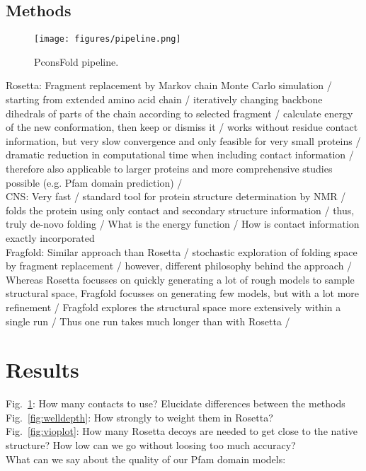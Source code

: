 \documentclass{bioinfo}
\begin{document}
\begin{methods}
\section{Methods}
\begin{figure}[!tpb]%
    \centerline{\texttt{[image: figures/pipeline.png]}}
\caption{PconsFold pipeline.}\label{fig:main}
\end{figure}
Rosetta: Fragment replacement by Markov chain Monte Carlo simulation / starting from extended amino acid chain / iteratively changing backbone dihedrals of parts of the chain according to selected fragment / calculate energy of the new conformation, then keep or dismiss it / works without residue contact information, but very slow convergence and only feasible for very small proteins / dramatic reduction in computational time when including contact information / therefore also applicable to larger proteins and more comprehensive studies possible (e.g. Pfam domain prediction) / \\
CNS: Very fast / standard tool for protein structure determination by NMR / folds the protein using only contact and secondary structure information / thus, truly de-novo folding / What is the energy function / How is contact information exactly incorporated \\
Fragfold: Similar approach than Rosetta / stochastic exploration of folding space by fragment replacement / however, different philosophy behind the approach / Whereas Rosetta focusses on quickly generating a lot of rough models to sample structural space, Fragfold focusses on generating few models, but with a lot more refinement / Fragfold explores the structural space more extensively within a single run / Thus one run takes much longer than with Rosetta / 


\end{methods}
\section{Results}
Fig.\ \ref{fig:main}: How many contacts to use? Elucidate differences between the methods \\
Fig.\ \ref{fig:welldepth}: How strongly to weight them in Rosetta? \\
Fig.\ \ref{fig:vioplot}: How many Rosetta decoys are needed to get close to the native structure? How low can we go without loosing too much accuracy? \\
What can we say about the quality of our Pfam domain models: \\
\end{document}
